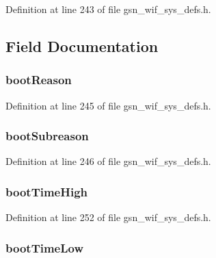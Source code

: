 Definition at line 243 of file gsn\_\-wif\_\-sys\_\-defs.h.



\subsection{Field Documentation}
\hypertarget{a00348_a81df1b1a967faea76636f64e7ebf3f4e}{
\subsubsection[{bootReason}]{ {\bf bootReason}}}
\label{a00348_a81df1b1a967faea76636f64e7ebf3f4e}


Definition at line 245 of file gsn\_\-wif\_\-sys\_\-defs.h.

\hypertarget{a00348_a7ca6fad2381173efde7ef12e9c546923}{
\subsubsection[{bootSubreason}]{ {\bf bootSubreason}}}
\label{a00348_a7ca6fad2381173efde7ef12e9c546923}


Definition at line 246 of file gsn\_\-wif\_\-sys\_\-defs.h.

\hypertarget{a00348_ab360fb81514af95b2c567b11bc326d72}{
\subsubsection[{bootTimeHigh}]{ {\bf bootTimeHigh}}}
\label{a00348_ab360fb81514af95b2c567b11bc326d72}


Definition at line 252 of file gsn\_\-wif\_\-sys\_\-defs.h.

\hypertarget{a00348_ac4320494d78b18891e3da4896e6ab01d}{
\subsubsection[{bootTimeLow}]{ {\bf bootTimeLow}}}
\label{a00348_ac4320494d78b18891e3da4896e6ab01d}


